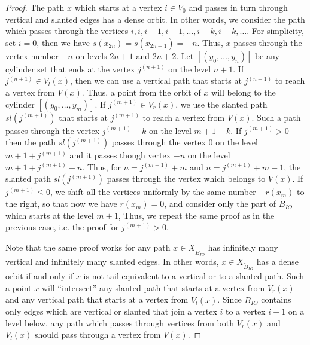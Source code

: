 \documentclass[11pt, twoside]{amsart}
\theoremstyle{definition}
\theoremstyle{remark}
\theoremstyle{plain}
\newcommand{\tcr}{\textcolor{red}}
\def\tl{\widetilde}
\numberwithin{equation}{section}
\begin{document}
\begin{proof}
     The path $x$ which starts at a vertex $i \in V_0$ and passes in turn through vertical and slanted edges has a dense orbit. In other words, we consider the path which passes through the vertices $i, i, i - 1, i - 1, \ldots, i - k, i - k, \ldots$. 
     For simplicity, set $i = 0$, then we have $s(x_{2n}) = s(x_{2n + 1}) = -n$. Thus, $x$ passes through the vertex number $-n$ on levels $2n+1$ and $2n+2$. 
      Let $[(y_0, \ldots, y_n)]$ be any cylinder set that ends at the vertex $j^{(n+1)}$ on the level $n + 1$. If $j^{(n+1)} \in V_{l}(x)$, then we can use a vertical path that starts at $j^{(n+1)}$ to reach a vertex from $V(x)$. Thus, a point from the orbit of $x$ will belong to the cylinder $[(y_0, \ldots, y_m)]$. If $j^{(m+1)} \in V_{r}(x)$, we use the slanted path $sl(j^{(m+1)})$ that starts at $j^{(m+1)}$ to reach a vertex from $V(x)$. Such a path passes through the vertex $j^{(m+1)} - k$ on the level $m + 1 + k$.  If $j^{(m+1)} > 0$ then the path $sl(j^{(m+1)})$ passes through the vertex $0$ on the level $m + 1 + j^{(m+1)}$ and it passes though vertex $-n$ on the level $m + 1 + j^{(m+1)} + n$. Thus, for $n = j^{(m+1)} + m$ and $n = j^{(m+1)} + m - 1$, the slanted path $sl(j^{(m+1)})$ passes through the vertex which belongs to $V(x)$. If $j^{(m+1)} \leq 0$, we shift all the vertices uniformly by the same number $-r(x_m)$ to the right, so that now we have $r(x_m) = 0$, and consider only the part of $\tl B_{IO}$ which starts at the level $m+1$, Thus, we repeat the same proof as in the previous case, i.e. the proof for $j^{(m+1)} > 0$.  

      Note that the same proof works for any path $x \in X_{\tl B_{IO}}$ has infinitely many vertical and infinitely many slanted edges. In other words, $x \in X_{\tl B_{IO}}$ has a dense orbit if and only if $x$ is not tail equivalent to a vertical or to a slanted path. Such a point $x$ will ``intersect'' any slanted path that starts at a vertex from $V_r(x)$ and any vertical path that starts at a vertex from $V_{l}(x)$. Since $\tl B_{IO}$ contains only edges which are vertical or slanted that join a vertex $i$ to a vertex $i - 1$ on a level below, any path which passes through vertices from both $V_r(x)$ and $V_l(x)$ should pass through a vertex from $V(x)$. 
\end{proof}
\end{document}
